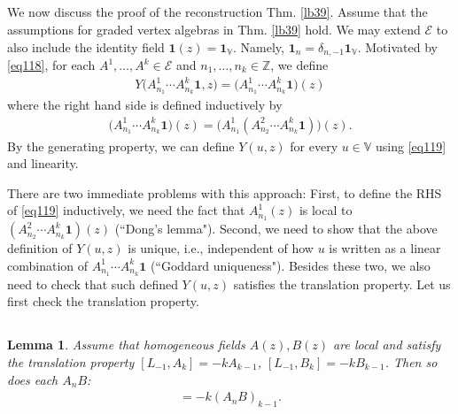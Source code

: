 \documentclass[11pt,b5paper,notitlepage]{article}
\theoremstyle{definition}
\theoremstyle{plain}
\newtheorem{lm}[df]{Lemma}
\newcommand{\mc}{\mathcal}
\newcommand{\id}{\mathbf{1}}
\newcommand{\Vbb}{\mathbb V}
\newcommand{\Zbb}{\mathbb Z}
\numberwithin{equation}{section}
\begin{document}
\subsection{}

We now discuss the proof of the reconstruction Thm. \ref{lb39}. Assume that the assumptions for graded vertex algebras in Thm. \ref{lb39} hold. We may extend $\mc E$ to also include the identity field $\id(z)=\id_\Vbb$. Namely, $\id_n=\delta_{n,-1}\id_\Vbb$. Motivated by \eqref{eq118}, for each $A^1,\dots,A^k\in\mc E$ and $n_1,\dots,n_k\in\Zbb$, we define
\begin{align}
	Y\big(A^1_{n_1}\cdots A^k_{n_k}\id,z\big)=\big(A^1_{n_1}\cdots A^k_{n_k}\id\big)(z)\label{eq119}
\end{align}
where the right hand side is defined inductively by
\begin{align*}
	\big(A^1_{n_1}\cdots A^k_{n_k}\id\big)(z)=\big(A^1_{n_1}(A^2_{n_2}\cdots A^k_{n_k}\id)\big)(z).
\end{align*}
By the generating property, we can define $Y(u,z)$ for every $u\in\Vbb$ using \eqref{eq119} and linearity. 

There are two immediate problems with this approach: First, to define the RHS of \eqref{eq119} inductively, we need the fact that $A^1_{n_1}(z)$ is local to $(A^2_{n_2}\cdots A^k_{n_k}\id)(z)$ (``Dong's lemma"). Second, we need to show that the above definition of $Y(u,z)$ is unique, i.e., independent of how $u$ is written as a linear combination of  $A^1_{n_1}\cdots A^k_{n_k}\id$ (``Goddard uniqueness"). Besides these two, we also need to check that such defined $Y(u,z)$ satisfies the translation property. Let us first check the translation property.



\subsection{}

\begin{lm}\label{lb79}
Assume that homogeneous fields $A(z),B(z)$ are local and satisfy the translation property $[L_{-1},A_k]=-kA_{k-1}$, $[L_{-1},B_k]=-kB_{k-1}$. Then so does each $A_nB$:
\begin{align}
[L_{-1},(A_nB)_k]=-k(A_nB)_{k-1}.\label{eq120}	
\end{align}
\end{lm}
\end{document}
